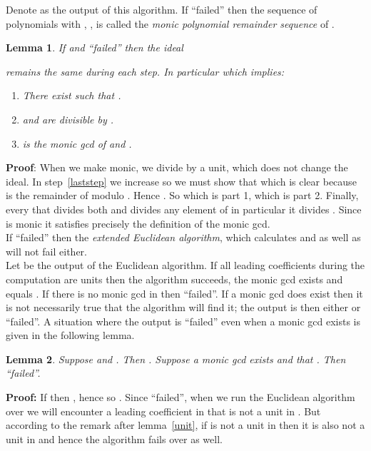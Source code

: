 \documentclass[10pt]{article}
\newtheorem{lemma}{Lemma}
\begin{document}
Denote  as the output of this algorithm.
If  ``failed'' then
the sequence of polynomials  with , ,
is called the {\em monic polynomial remainder sequence} of .
\begin{lemma}
\label{st_exist}
If 
and  ``failed'' then the ideal

remains the same during each step.
In particular  which implies:
\begin{enumerate}
\item There exist  such
      that .
\item  and  are divisible by .
\item  is the monic gcd of  and .
\end{enumerate}
\end{lemma}
{\bf Proof}: When we make  monic, we divide by a unit, which does not
change the ideal. In step~\ref{laststep} we increase  so we must show
that  which is clear because  is
the remainder of  modulo .
Hence . So 
which is part 1,  which is part 2. Finally, every  that
divides both  and  divides any element of  in particular
it divides . Since  is monic it satisfies precisely the definition
of the monic gcd. \\

 If  ``failed'' then the
{\em extended Euclidean algorithm}, which calculates  and  as well as 
will not fail either. \\

Let  be the output of the Euclidean algorithm.
If all leading coefficients during the computation
are units then the algorithm succeeds, the monic gcd exists and
equals .
If there is no monic gcd in 
then  ``failed''.
If a monic gcd  does exist then it is not necessarily true that
the algorithm will find it; the output  is then either  or ``failed''.
A situation where the output is ``failed'' even when a monic gcd exists
is given in the following lemma.
\begin{lemma}
\label{lemmaTestNotNeeded}
Suppose  and . Then  .
Suppose a monic gcd  exists and that .
Then  ``failed''.
\end{lemma}
{\bf Proof:}
If  then ,
hence  so .
Since  ``failed'', when we run the
Euclidean algorithm over  we will encounter a leading coefficient in 
that is not a unit in . But according to the remark after lemma~\ref{unit},
if  is not a unit in  then it is also not a unit in 
and hence the algorithm fails over  as well.
\\
\end{document}
